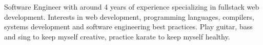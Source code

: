 

\begin{cvparagraph}

Software Engineer with around 4 years of experience specializing in fullstack web development. Interests in web development, programming languages, compilers, systems development and software engineering best practices. Play guitar, bass and sing to keep myself creative, practice karate to keep myself healthy.

\end{cvparagraph}
